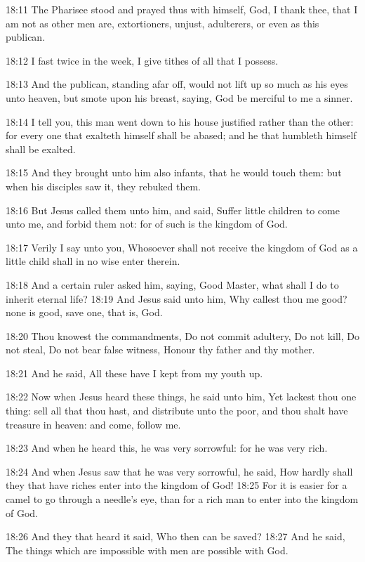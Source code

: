 18:11 The Pharisee stood and prayed thus with himself, God, I thank thee, that I am not as other men are, extortioners, unjust, adulterers, or even as this publican.

18:12 I fast twice in the week, I give tithes of all that I possess.

18:13 And the publican, standing afar off, would not lift up so much as his eyes unto heaven, but smote upon his breast, saying, God be merciful to me a sinner.

18:14 I tell you, this man went down to his house justified rather than the other: for every one that exalteth himself shall be abased; and he that humbleth himself shall be exalted.

18:15 And they brought unto him also infants, that he would touch them: but when his disciples saw it, they rebuked them.

18:16 But Jesus called them unto him, and said, Suffer little children to come unto me, and forbid them not: for of such is the kingdom of God.

18:17 Verily I say unto you, Whosoever shall not receive the kingdom of God as a little child shall in no wise enter therein.

18:18 And a certain ruler asked him, saying, Good Master, what shall I do to inherit eternal life?  18:19 And Jesus said unto him, Why callest thou me good? none is good, save one, that is, God.

18:20 Thou knowest the commandments, Do not commit adultery, Do not kill, Do not steal, Do not bear false witness, Honour thy father and thy mother.

18:21 And he said, All these have I kept from my youth up.

18:22 Now when Jesus heard these things, he said unto him, Yet lackest thou one thing: sell all that thou hast, and distribute unto the poor, and thou shalt have treasure in heaven: and come, follow me.

18:23 And when he heard this, he was very sorrowful: for he was very rich.

18:24 And when Jesus saw that he was very sorrowful, he said, How hardly shall they that have riches enter into the kingdom of God!  18:25 For it is easier for a camel to go through a needle's eye, than for a rich man to enter into the kingdom of God.

18:26 And they that heard it said, Who then can be saved?  18:27 And he said, The things which are impossible with men are possible with God.

